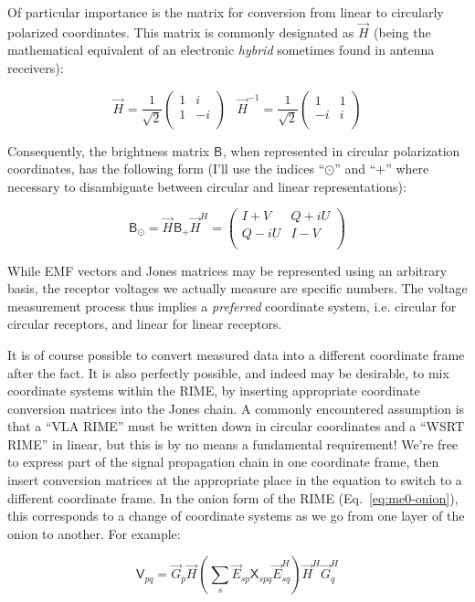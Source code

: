 \documentclass{aa}
\newcommand{\matrixtt}[4]{\left( \begin{array}{cc}#1&#2\\#3&#4\\\end{array} \right)}
\newcommand{\herm}{H}
\newcommand{\jones}[2]{\vec {#1}_{#2}}
\newcommand{\jonesinv}[2]{\vec {#1}^{-1}_{#2}}
\newcommand{\jonesT}[2]{\vec {#1}^{\herm}_{#2}}
\newcommand{\coh}[2]{\mathsf{{#1}}_{{#2}}}
\begin{document}
Of particular importance is the matrix for conversion from linear to circularly polarized coordinates. This matrix is commonly designated as $\jones{H}{}$ (being the mathematical equivalent of an electronic {\em hybrid} sometimes found in antenna receivers):

\[
\jones{H}{} = \frac{1}{\sqrt{2}} \matrixtt{1}{i}{1}{-i} \;\;\; \jonesinv{H}{} = \frac{1}{\sqrt{2}} \matrixtt{1}{1}{-i}{i}
\]

Consequently, the brightness matrix $\coh{B}{}$, when represented in circular polarization coordinates, has the following form (I'll use the indices ``$\odot$'' and ``$+$'' where necessary to disambiguate between circular and linear representations):

\[
\coh{B}{\odot} = \jones{H}{} \coh{B}{+} \jonesT{H}{} = \matrixtt{I+V}{Q+iU}{Q-iU}{I-V}
\]

While EMF vectors and Jones matrices may be represented using an arbitrary basis, the receptor voltages we actually measure are specific numbers. The voltage measurement process thus implies a {\em preferred} coordinate system, i.e. circular for circular receptors, and linear for linear receptors. 

It is of course possible to convert measured data into a different coordinate frame after the fact. It is also perfectly possible, and indeed may be desirable, to mix coordinate systems within the RIME, by inserting appropriate coordinate conversion matrices into the Jones chain. A commonly encountered assumption is that a ``VLA RIME'' must be written down in circular coordinates and a ``WSRT RIME'' in linear, but this is by no means a fundamental requirement! We're free to express part of the signal propagation chain in one coordinate frame, then insert conversion matrices at the appropriate place in the equation to switch to a different coordinate frame. In the onion form of the RIME (Eq.~\ref{eq:me0-onion}), this corresponds to a change of coordinate systems as we go from one layer of the onion to another. For example:

\[
\coh{V}{pq} = \jones{G}{p} \jones{H}{} \left ( \sum_{s} \jones{E}{sp} \coh{X}{spq} 
\jonesT{E}{sq} \right ) \jonesT{H}{} \jonesT{G}{q}
\] 
\end{document}
